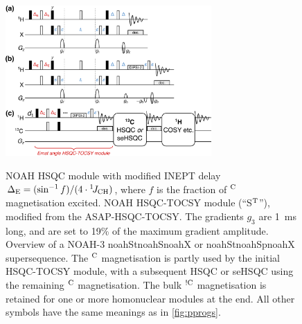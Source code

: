 \documentclass[11pt]{article}
\newcommand*{\noahthree}[3]{\csname noah#1\endcsname\csname noah#2\endcsname\csname noah#3\endcsname}
\newcommand*{\noahSt}{S$\rm ^T$}
\newcommand*{\onejch}{{}^{1}\!J_{\ce{CH}}}
\newcommand*{\magn}[1]{\ce{^1H}$^{#1}$}
\newcommand*{\magnnot}[1]{\ce{^1H}$^{!#1}$}
\begin{document}
\begin{refsection}
\begin{figure}
    \centering
    \includegraphics[width=0.7\textwidth]{pprogs_hsqct.png}
    {\label{fig:pprogs_hsqct_hsqc}}
    {\label{fig:pprogs_hsqct_hsqct}}
    {\label{fig:pprogs_hsqct_superseq}}
    \caption{
        \textbf{} NOAH HSQC module with modified INEPT delay $\Delta_{\mathrm{E}} = (\sin^{-1} f)/(4\cdot\onejch)$, where $f$ is the fraction of \magn{\ce{C}} magnetisation excited.
        \textbf{} NOAH HSQC-TOCSY module (``\noahSt{}''), modified from the ASAP-HSQC-TOCSY.\autocite{Becker2019JMR}
        The gradients $g_3$ are \SI{1}{\ms} long, and are set to 19\% of the maximum gradient amplitude.
        \textbf{} Overview of a NOAH-3 \noahthree{St}{S}{X} or \noahthree{St}{Sp}{X} supersequence.
        The \magn{\ce{C}} magnetisation is partly used by the initial HSQC-TOCSY module, with a subsequent HSQC or seHSQC using the remaining \magn{\ce{C}} magnetisation.
        The bulk \magnnot{\ce{C}} magnetisation is retained for one or more homonuclear modules at the end.
        All other symbols have the same meanings as in \cref{fig:pprogs}.
    }
    \label{fig:pprogs_hsqct}
\end{figure}


\end{refsection}
\end{document}
